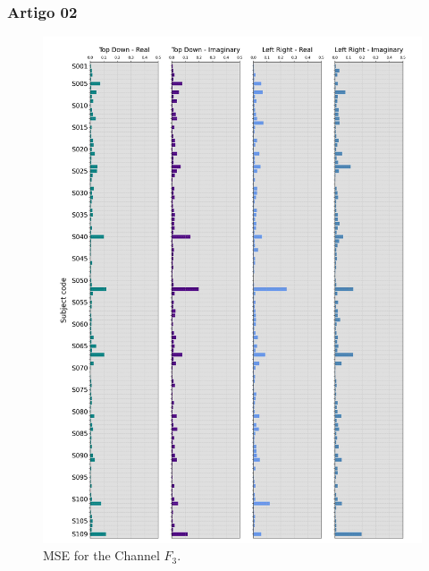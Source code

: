 \documentclass[11pt, aspectratio=169]{beamer}
\begin{document}
\begin{frame}
  \frametitle{Artigo 02}


  \begin{figure}[ht]
    \begin{minipage}[b]{0.21\linewidth}
      \centering
      \includegraphics[height=.5\paperheight]{../Figures/art_02/Fig10.jpg}
      \caption{MSE for the Channel $F_{3}$.}
      \label{fig21}


\end{minipage}
\end{figure}
\end{frame}
\end{document}
